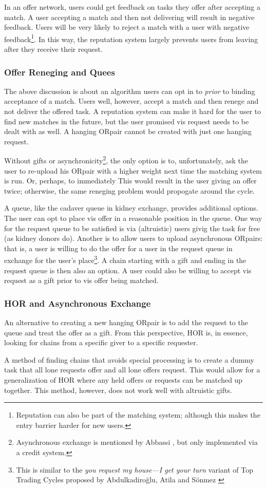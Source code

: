 \documentclass[main.tex]{subfiles}
\begin{document}
In an offer network, users could get feedback on tasks they offer after accepting a match. A user accepting a match and then not delivering will result in negative feedback. Users will be very likely to reject a match with a user with negative feedback\footnote{Reputation can also be part of the matching system; although this makes the entry barrier harder for new users.}. In this way, the reputation system largely prevents users from leaving after they receive their request.

\subsubsection{Offer Reneging and Quees} \label{sec:horquee}
The above discussion is about an algorithm users can opt in to \textit{prior} to binding acceptance of a match. Users well, however, accept a match and then renege and not deliver the offered task. A reputation system can make it hard for the user to find new matches in the future, but the user promised vis request needs to be dealt with as well. A hanging ORpair cannot be created with just one hanging request.

Without gifts or asynchronicity\footnote{Asynchronous exchange is mentioned by Abbassi \cite{Abb2}, but only implemented via a credit system.}, the only option is to, unfortunately, ask the user to re-upload his ORpair with a higher weight next time the matching system is run. Or, perhaps, to immediately  This would result in the user giving an offer twice; otherwise, the same reneging problem would propogate around the cycle.

A queue, like the cadaver queue in kidney exchange, provides additional options. The user can opt to place vis offer in a reasonable position in the queue. One way for the request queue to be satisfied is via (altruistic) users givig the task for free (as kidney donors do). Another is to allow users to upload asynchronous ORpairs: that is, a user is willing to do the offer for a user in the request queue in exchange for the user's place\footnote{This is similar to the \textit{you request
my house—I get your turn} variant of Top Trading Cycles proposed by Abdulkadiro{\u{g}}lu, Atila and S{\"o}nmez \cite{abd1}}. A chain starting with a gift and ending in the request queue is then also an option. A user could also be willing to accept vis request as a gift prior to vis offer being matched.

\subsubsection{HOR and Asynchronous Exchange}
An alternative to creating a new hanging ORpair is to add the request to the queue and treat the offer as a gift. From this perspective, HOR is, in essence, looking for chains from a specific giver to a specific requester.

A method of finding chains that avoids special processing is to create a dummy task that all lone requests offer and all lone offers request. This would allow for a generalization of HOR where any held offers or requests can be matched up together. This method, however, does not work well with altruistic gifts.
\end{document}

